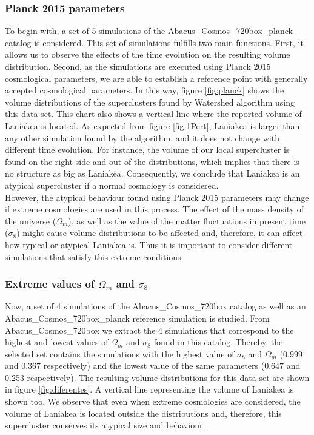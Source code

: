 \documentclass[usenatbib]{mnras}
\begin{document}
\subsubsection{Planck 2015 parameters}

To begin with, a set of 5 simulations of the Abacus\_Cosmos\_720box\_planck catalog is considered. This set of simulations fulfills two main functions. First, it allows us to observe the effects of the time evolution on the resulting volume distribution. Second, as the simulations are executed using Planck 2015 cosmological parameters, we are able to establish a reference point with generally accepted cosmological parameters. In this way, figure \ref{fig:planck} shows the volume distributions of the superclusters found by Watershed algorithm using this data set. This chart also shows a vertical line where the reported volume of Laniakea is located. As expected from figure \ref{fig:1Pert}, Laniakea is larger than any other simulation found by the algorithm, and it does not change with different time evolution. For instance, the volume of our local supercluster is found on the right side and out of the distributions, which implies that there is no structure as big as Laniakea. Consequently, we conclude that Laniakea is an atypical supercluster if a normal cosmology is considered. \\



However, the atypical behaviour found using Planck 2015 parameters may change if extreme cosmologies are used in this process. The effect of the mass density of the universe ($\Omega_m$), as well as the value of the matter fluctuations in present time ($\sigma_8$) might cause volume distributions to be affected and, therefore, it can affect how typical or atypical Laniakea is. Thus it is important to consider different simulations that satisfy this extreme conditions.


\subsubsection{Extreme values of $\Omega_m$ and $\sigma_8$}

Now, a set of 4 simulations of the Abacus\_Cosmos\_720box catalog as well as an Abacus\_Cosmos\_720box\_planck reference simulation is studied. From Abacus\_Cosmos\_720box we extract the 4 simulations that correspond to the highest and lowest values of $\Omega_m$ and $\sigma_8$ found in this catalog. Thereby, the selected set contains the simulations with the highest value of $\sigma_8$ and $\Omega_m$ (0.999 and 0.367 respectively) and the lowest value of the same parameters (0.647 and 0.253 respectively). The resulting volume distributions for this data set are shown in figure \ref{fig:diferentes}. A vertical line representing the volume of Laniakea is shown too. We observe that even when extreme cosmologies are considered, the volume of Laniakea is located outside the distributions and, therefore, this supercluster conserves its atypical size and behaviour.
\end{document}
